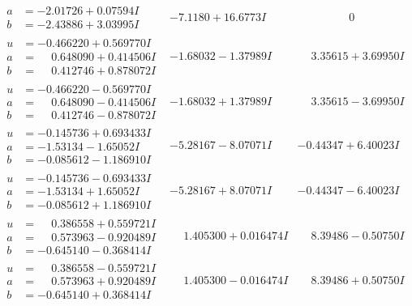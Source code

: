 \documentclass[1p]{elsarticle_modified}
\theoremstyle{definition}
\begin{document}
$$\begin{array}{c|c|c}
\begin{aligned}
a &= -2.01726 + 0.07594 I \\
b &= -2.43886 + 3.03995 I\end{aligned}
 & -7.1180 + 16.6773 I & \phantom{-0.000000 } 0 \\ \hline\begin{aligned}
u &= -0.466220 + 0.569770 I \\
a &= \phantom{-}0.648090 + 0.414506 I \\
b &= \phantom{-}0.412746 + 0.878072 I\end{aligned}
 & -1.68032 - 1.37989 I & \phantom{-}3.35615 + 3.69950 I \\ \hline\begin{aligned}
u &= -0.466220 - 0.569770 I \\
a &= \phantom{-}0.648090 - 0.414506 I \\
b &= \phantom{-}0.412746 - 0.878072 I\end{aligned}
 & -1.68032 + 1.37989 I & \phantom{-}3.35615 - 3.69950 I \\ \hline\begin{aligned}
u &= -0.145736 + 0.693433 I \\
a &= -1.53134 - 1.65052 I \\
b &= -0.085612 - 1.186910 I\end{aligned}
 & -5.28167 - 8.07071 I & -0.44347 + 6.40023 I \\ \hline\begin{aligned}
u &= -0.145736 - 0.693433 I \\
a &= -1.53134 + 1.65052 I \\
b &= -0.085612 + 1.186910 I\end{aligned}
 & -5.28167 + 8.07071 I & -0.44347 - 6.40023 I \\ \hline\begin{aligned}
u &= \phantom{-}0.386558 + 0.559721 I \\
a &= \phantom{-}0.573963 - 0.920489 I \\
b &= -0.645140 - 0.368414 I\end{aligned}
 & \phantom{-}1.405300 + 0.016474 I & \phantom{-}8.39486 - 0.50750 I \\ \hline\begin{aligned}
u &= \phantom{-}0.386558 - 0.559721 I \\
a &= \phantom{-}0.573963 + 0.920489 I \\
b &= -0.645140 + 0.368414 I\end{aligned}
 & \phantom{-}1.405300 - 0.016474 I & \phantom{-}8.39486 + 0.50750 I \\ \hline\begin{aligned}

\end{aligned}
\end{array}$$
\end{document}

